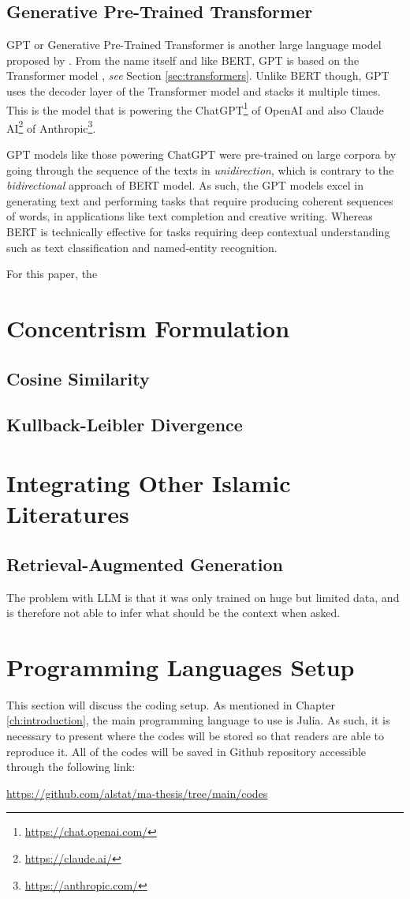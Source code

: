 \subsection{Generative Pre-Trained Transformer}
GPT or Generative Pre-Trained Transformer is another large language model proposed by \cite{radford2018improving}. From the name itself and like BERT, GPT is based on the Transformer model \cite{vaswani2017attention}, \textit{see} Section \ref{sec:transformers}. Unlike BERT though, GPT uses the decoder layer of the Transformer model and stacks it multiple times. This is the model that is powering the ChatGPT\footnote{\url{https://chat.openai.com/}} of OpenAI and also Claude AI\footnote{\url{https://claude.ai/}} of Anthropic\footnote{\url{https://anthropic.com/}}.

GPT models like those powering ChatGPT were pre-trained on large corpora by going through the sequence of the texts in \textit{unidirection}, which is contrary to the \textit{bidirectional} approach of BERT model. As such, the GPT models excel in generating text and performing tasks that require producing coherent sequences of words, in applications like text completion and creative writing. Whereas BERT is technically effective for tasks requiring deep contextual understanding such as text classification and named-entity recognition.

For this paper, the 
\section{Concentrism Formulation}
\subsection{Cosine Similarity}
\subsection{Kullback-Leibler Divergence}
\section{Integrating Other Islamic Literatures}
\subsection{Retrieval-Augmented Generation}
The problem with LLM is that it was only trained on huge but limited data, and is therefore not able to infer what should be the context when asked.
\section{Programming Languages Setup}\label{sec:code_setup}
This section will discuss the coding setup. As mentioned in Chapter \ref{ch:introduction}, the main programming language to use is Julia. As such, it is necessary to present where the codes will be stored so that readers are able to reproduce it. All of the codes will be saved in Github repository accessible through the following link:
\begin{center}
    \url{https://github.com/alstat/ma-thesis/tree/main/codes}
\end{center}
